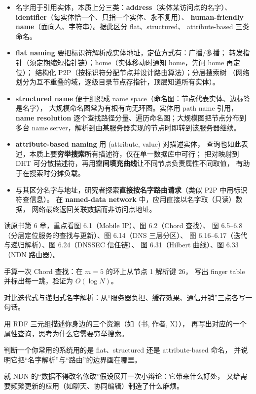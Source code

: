 

\begin{itemize}
  \item 名字用于引用实体，本质上分三类：\textbf{address}（实体某访问点的名字）、
        \textbf{identifier}（每实体恰一个、只指一个实体、永不复用）、
        \textbf{human-friendly name}（面向人、字符串）。据此区分 flat、structured、
        attribute-based 三类命名。
  \item \textbf{flat naming} 要把标识符解析成实体地址，定位方式有：广播/多播；
        转发指针（须定期缩短指针链）；home（实体移动时通知 home，先问 home 再定位）；
        结构化 P2P（按标识符分配节点并设计路由算法）；分层搜索树
        （网络划分为互不重叠的域，逐级目录节点存指针，顶层知道所有实体）。
  \item \textbf{structured name} 便于组织成 name space（命名图：节点代表实体、边标签是名字），
        大规模命名图常为有根有向无环图。实体用 path name 引用，
        \textbf{name resolution} 逐个查找路径分量、遍历命名图；大规模图把节点分布到多台
        name server，解析到由某服务器实现的节点时即转到该服务器继续。
  \item \textbf{attribute-based naming} 用 (attribute, value) 对描述实体，
        查询也如此表述，本质上要\textbf{穷举搜索}所有描述符，仅在单一数据库中可行；
        把对映射到 DHT 可分散描述符，再用\textbf{空间填充曲线}让不同节点负责属性不同取值，
        有助于在搜索时分摊负载。
  \item 与其区分名字与地址，研究者探索\textbf{直接按名字路由请求}（类似 P2P 中用标识符查信息）。
        在 \textbf{named-data network} 中，应用直接以名字取（只读）数据，
        网络最终返回关联数据而非访问点地址。
\end{itemize}

\begin{actions}
  \item 读原书第 6 章，重点看图 6.1（Mobile IP）、图 6.2（Chord 查找）、
        图 6.5--6.8（分层定位服务的查找与更新）、图 6.14（DNS 三层分区）、
        图 6.16--6.17（迭代与递归解析）、图 6.24（DNSSEC 信任链）、
        图 6.31（Hilbert 曲线）、图 6.33（NDN 路由器）。
  \item 手算一次 Chord 查找：在 $m=5$ 的环上从节点 1 解析键 26，
        写出 finger table 并标出每一跳，验证为 $O(\log N)$。
  \item 对比迭代式与递归式名字解析：从“服务器负担、缓存效果、通信开销”三点各写一句话。
  \item 用 RDF 三元组描述你身边的三个资源（如（书, 作者, X）），
        再写出对应的一个属性查询，思考为什么它需要穷举搜索。
  \item 判断一个你常用的系统用的是 flat、structured 还是 attribute-based 命名，
        并说明它把“名字解析”与“路由”的边界画在哪里。
  \item 就 NDN 的“数据不得改名修改”假设展开一次小辩论：它带来什么好处，
        又给需要频繁更新的应用（如聊天、协同编辑）制造了什么麻烦。
\end{actions}
